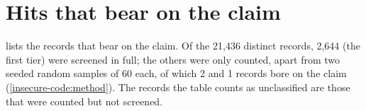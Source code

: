 \section{Hits that bear on the claim}
\label{insecure-code:hits}

 lists the records that bear on the claim.
Of the 21,436 distinct records, 2,644 (the first tier) were screened in
full; the others were only counted, apart from two seeded random samples of
60 each, of which 2 and 1 records bore on the claim
(\cref{insecure-code:method}).
The records the table counts as unclassified are those that were counted
but not screened.

